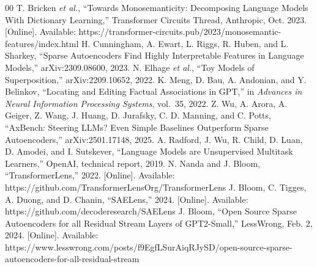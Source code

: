 \documentclass[conference]{IEEEtran}
\begin{document}
\begin{thebibliography}{00}
 T. Bricken \emph{et al.}, ``Towards Monosemanticity: Decomposing Language Models With Dictionary Learning,'' Transformer Circuits Thread, Anthropic, Oct. 2023. [Online]. Available: https://transformer-circuits.pub/2023/monosemantic-features/index.html
 H. Cunningham, A. Ewart, L. Riggs, R. Huben, and L. Sharkey, ``Sparse Autoencoders Find Highly Interpretable Features in Language Models,'' arXiv:2309.08600, 2023.
 N. Elhage \emph{et al.}, ``Toy Models of Superposition,'' arXiv:2209.10652, 2022.
 K. Meng, D. Bau, A. Andonian, and Y. Belinkov, ``Locating and Editing Factual Associations in GPT,'' in \emph{Advances in Neural Information Processing Systems}, vol.~35, 2022.
 Z. Wu, A. Arora, A. Geiger, Z. Wang, J. Huang, D. Jurafsky, C. D. Manning, and C. Potts, ``AxBench: Steering LLMs? Even Simple Baselines Outperform Sparse Autoencoders,'' arXiv:2501.17148, 2025.
 A. Radford, J. Wu, R. Child, D. Luan, D. Amodei, and I. Sutskever, ``Language Models are Unsupervised Multitask Learners,'' OpenAI, technical report, 2019.
 N. Nanda and J. Bloom, ``TransformerLens,'' 2022. [Online]. Available: https://github.com/TransformerLensOrg/TransformerLens
 J. Bloom, C. Tigges, A. Duong, and D. Chanin, ``SAELens,'' 2024. [Online]. Available: https://github.com/decoderesearch/SAELens
 J. Bloom, ``Open Source Sparse Autoencoders for all Residual Stream Layers of GPT2-Small,'' LessWrong, Feb. 2, 2024. [Online]. Available: https://www.lesswrong.com/posts/f9EgfLSurAiqRJySD/open-source-sparse-autoencoders-for-all-residual-stream
\end{thebibliography}
\end{document}
